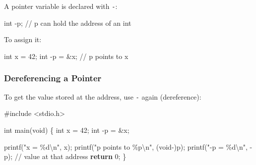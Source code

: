 \documentclass[
  letterpaper,
  DIV=11,
  numbers=noendperiod]{scrreprt}
\newenvironment{Shaded}{\begin{snugshade}}{\end{snugshade}}
\newcommand{\CommentTok}[1]{\textcolor[rgb]{0.37,0.37,0.37}{#1}}
\newcommand{\ControlFlowTok}[1]{\textcolor[rgb]{0.00,0.23,0.31}{\textbf{#1}}}
\newcommand{\DataTypeTok}[1]{\textcolor[rgb]{0.68,0.00,0.00}{#1}}
\newcommand{\DecValTok}[1]{\textcolor[rgb]{0.68,0.00,0.00}{#1}}
\newcommand{\ImportTok}[1]{\textcolor[rgb]{0.00,0.46,0.62}{#1}}
\newcommand{\NormalTok}[1]{\textcolor[rgb]{0.00,0.23,0.31}{#1}}
\newcommand{\OperatorTok}[1]{\textcolor[rgb]{0.37,0.37,0.37}{#1}}
\newcommand{\PreprocessorTok}[1]{\textcolor[rgb]{0.68,0.00,0.00}{#1}}
\newcommand{\SpecialCharTok}[1]{\textcolor[rgb]{0.37,0.37,0.37}{#1}}
\newcommand{\StringTok}[1]{\textcolor[rgb]{0.13,0.47,0.30}{#1}}
\begin{document}
A pointer variable is declared with \texttt{-}:

\begin{Shaded}
\begin{Highlighting}[]
\DataTypeTok{int} \OperatorTok{{-}}\NormalTok{p}\OperatorTok{;}   \CommentTok{// p can hold the address of an int}
\end{Highlighting}
\end{Shaded}

To assign it:

\begin{Shaded}
\begin{Highlighting}[]
\DataTypeTok{int}\NormalTok{ x }\OperatorTok{=} \DecValTok{42}\OperatorTok{;}
\DataTypeTok{int} \OperatorTok{{-}}\NormalTok{p }\OperatorTok{=} \OperatorTok{\&}\NormalTok{x}\OperatorTok{;}   \CommentTok{// p points to x}
\end{Highlighting}
\end{Shaded}

\subsubsection{Dereferencing a Pointer}\label{dereferencing-a-pointer}

To get the value stored at the address, use \texttt{-} again
(dereference):

\begin{Shaded}
\begin{Highlighting}[]
\PreprocessorTok{\#include }\ImportTok{\textless{}stdio.h\textgreater{}}

\DataTypeTok{int}\NormalTok{ main}\OperatorTok{(}\DataTypeTok{void}\OperatorTok{)} \OperatorTok{\{}
    \DataTypeTok{int}\NormalTok{ x }\OperatorTok{=} \DecValTok{42}\OperatorTok{;}
    \DataTypeTok{int} \OperatorTok{{-}}\NormalTok{p }\OperatorTok{=} \OperatorTok{\&}\NormalTok{x}\OperatorTok{;}

\NormalTok{    printf}\OperatorTok{(}\StringTok{"x = }\SpecialCharTok{\%d\textbackslash{}n}\StringTok{"}\OperatorTok{,}\NormalTok{ x}\OperatorTok{);}
\NormalTok{    printf}\OperatorTok{(}\StringTok{"p points to }\SpecialCharTok{\%p\textbackslash{}n}\StringTok{"}\OperatorTok{,} \OperatorTok{(}\DataTypeTok{void}\OperatorTok{{-})}\NormalTok{p}\OperatorTok{);}
\NormalTok{    printf}\OperatorTok{(}\StringTok{"{-}p = }\SpecialCharTok{\%d\textbackslash{}n}\StringTok{"}\OperatorTok{,} \OperatorTok{{-}}\NormalTok{p}\OperatorTok{);}   \CommentTok{// value at that address}
    \ControlFlowTok{return} \DecValTok{0}\OperatorTok{;}
\OperatorTok{\}}
\end{Highlighting}
\end{Shaded}
\end{document}

